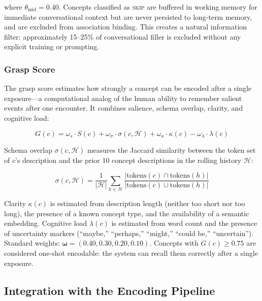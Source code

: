 \documentclass[11pt,twocolumn]{article}
\begin{document}
where $\theta_{\text{mid}} = 0.40$. Concepts classified as \textsc{skip} are buffered in working memory for immediate conversational context but are never persisted to long-term memory, and are excluded from association binding. This creates a natural information filter: approximately 15--25\% of conversational filler is excluded without any explicit training or prompting.

\subsubsection{Grasp Score}

The grasp score estimates how strongly a concept can be encoded after a single exposure---a computational analog of the human ability to remember salient events after one encounter. It combines salience, schema overlap, clarity, and cognitive load:

\begin{equation}
G(c) = \omega_s \cdot S(c) + \omega_\sigma \cdot \sigma(c, \mathcal{H}) + \omega_\kappa \cdot \kappa(c) - \omega_\lambda \cdot \lambda(c)
\label{eq:grasp}
\end{equation}

Schema overlap $\sigma(c, \mathcal{H})$ measures the Jaccard similarity between the token set of $c$'s description and the prior 10 concept descriptions in the rolling history $\mathcal{H}$:

\begin{equation}
\sigma(c, \mathcal{H}) = \frac{1}{|\mathcal{H}|} \sum_{h \in \mathcal{H}} \frac{|\text{tokens}(c) \cap \text{tokens}(h)|}{|\text{tokens}(c) \cup \text{tokens}(h)|}
\label{eq:schema_overlap}
\end{equation}

Clarity $\kappa(c)$ is estimated from description length (neither too short nor too long), the presence of a known concept type, and the availability of a semantic embedding. Cognitive load $\lambda(c)$ is estimated from word count and the presence of uncertainty markers (``maybe,'' ``perhaps,'' ``might,'' ``could be,'' ``uncertain''). Standard weights: $\boldsymbol{\omega} = (0.40, 0.30, 0.20, 0.10)$. Concepts with $G(c) \geq 0.75$ are considered one-shot encodable: the system can recall them correctly after a single exposure.

\subsection{Integration with the Encoding Pipeline}
\end{document}
